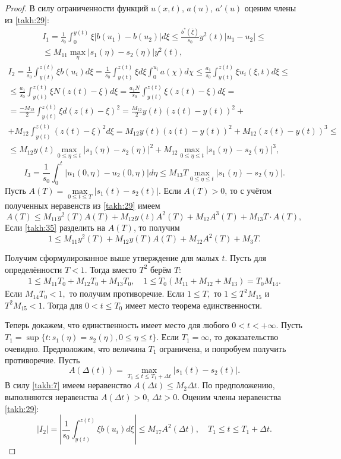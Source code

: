 \begin{proof}
В силу ограниченности функций $u(x,t)$, $a(u)$, $a'(u)$ оценим члены из
\eqref{takh:29}:
\begin{multline}
I_1=\frac{1}{s_0}\int_0^{y(t)}\xi|b(u_1)-b(u_2)|d\xi\leq\frac{b^{*}(\overline{\xi})}{s_0}
y^2(t)|u_1-u_2|\leq
\\
\leq M_{11}\max\limits_{\eta}|s_1(\eta)-s_2(\eta)|y^2(t),
\label{takh:32}
\end{multline}
\begin{multline}
I_2=\frac{1}{s_0}\int_{y(t)}^{z(t)}\xi b(u_i)d\xi=
\frac{1}{s_0}\int_{y(t)}^{z(t)}\xi
d\xi\int_{0}^{u_i}a(\chi) d\chi\leq
\frac{a_1}{s_0}\int_{y(t)}^{z(t)}\xi u_i(\xi,t)d\xi\leq
\\
\leq\frac{a_1}{s_0}\int_{y(t)}^{z(t)}\xi N(z(t)-\xi)d\xi=
\frac{a_1N}{s_0}\int_{y(t)}^{z(t)}\xi (z(t)-\xi)d\xi=
\\
=\frac{-M_{12}}{2}\int_{y(t)}^{z(t)}\xi d(z(t)-\xi)^2=
\frac{M_{12}}{2}y(t)(z(t)-y(t))^2+
\\
+M_{12}\int_{y(t)}^{z(t)}(z(t)-\xi)^2d\xi=
M_{12}y(t)(z(t)-y(t))^2+M_{12}(z(t)-y(t))^3\leq
\\
\leq M_{12}y(t)\max\limits_{0\leq\eta\leq
t}|s_1(\eta)-s_2(\eta)|^2+ M_{12}\max\limits_{0\leq\eta\leq
t}|s_1(\eta)-s_2(\eta)|^3,
\label{takh:33}
\end{multline}
\begin{equation}
I_3=\frac{1}{s_0}\int_0^t|u_1(0,\eta)-u_2(0,\eta)|d\eta\leq
M_{13}T\max\limits_{0\leq\eta\leq
t}|s_1(\eta)-s_2(\eta)|.
\label{takh:34}
\end{equation}
Пусть $A(T)=\max\limits_{0\leq t\leq T}|s_1(t)-s_2(t)|$. Если $A(T)>0$, то с учётом полученных
неравенств из \eqref{takh:29} имеем
\begin{equation}
A(T)\leq
M_{11}y^2(T)A(T)+M_{12}y(t)A^2(T)+M_{12}A^3(T)+M_{13}T\cdot A(T),
\label{takh:35}
\end{equation}
Если \eqref{takh:35} разделить на $A(T)$, то получим
$$
1\leq M_{11}y^2(T)+M_{12}y(T)A(T)+M_{12}A^2(T)+M_3T.
$$

Получим сформулированное выше утверждение для малых $t$. 
Пусть для определённости $T<1$. Тогда вместо $T^2$ берём $T$:
\begin{gather*}
1\leq M_{11}T_0+M_{12}T_0+M_{13}T_0,
\quad 
1\leq T_0(M_{11}+M_{12}+M_{13})=T_0M_{14}.
\end{gather*}
Если $M_{14}T_0<1,$ то получим противоречие. Если $1\leq T,$ то
$1\leq T^2M_{15}$ и $T^2M_{15}<1$. Тогда для $0<t\leq T_0$
имеет место теорема единственности. 

Теперь докажем, что единственность имеет место для любого $0<t<+\infty$.
Пусть $T_1=\sup\limits\{t:s_1(\eta)=s_2(\eta), 0\leq \eta\leq
t\}$. Если $T_1=\infty$, то доказательство очевидно. Предположим, что величина
$T_1$ ограничена, и попробуем получить противоречие.
Пусть
$$
A(\Delta(t))=\max\limits_{T_1\leq t\leq T_1+\Delta
t}|s_1(t)-s_2(t)|.
$$
В силу \eqref{takh:7} имеем неравенство $A(\Delta t)\leq M_2\Delta t$. По предположению, выполняются неравенства
$A(\Delta t)>0$, $\Delta t>0$. Оценим члены неравенства \eqref{takh:29}:
$$
|I_2|=\left|\frac{1}{s_0}\int_{y(t)}^{z(t)}\xi
b(u_i)d\xi\right|\leq M_{17}A^2(\Delta t), \quad  T_1\leq t\leq
T_1+\Delta t.
$$




\end{proof}
